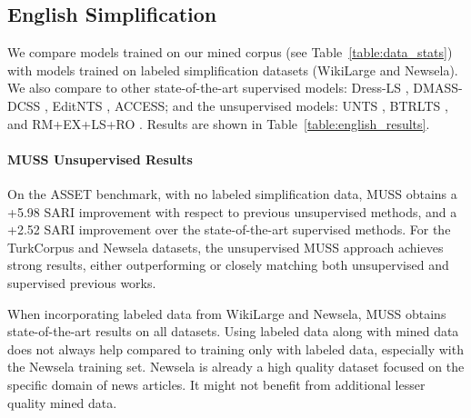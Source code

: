 \documentclass[11pt]{article}
\newcommand{\wikilarge}{WikiLarge\xspace}
\newcommand{\asset}{ASSET\xspace}
\newcommand{\newsela}{Newsela\xspace}
\newcommand{\turkcorpus}{TurkCorpus\xspace}
\newcommand{\muss}{\textsc{MUSS}\xspace}
\newcommand{\access}{\mbox{\textsc{ACCESS}}\xspace}
\begin{document}
\subsection{English Simplification}


We compare models trained on our mined corpus (see Table~\ref{table:data_stats}) with models trained on labeled simplification datasets (\wikilarge and \newsela). We also compare to other state-of-the-art supervised models: Dress-LS \cite{zhang2017sentence}, DMASS-DCSS \cite{zhao2018integrating}, EditNTS \cite{dong2019editnts}, \access \cite{martin2020controllable}; and the unsupervised models: UNTS \cite{surya2018unsupervised}, BTRLTS \cite{Zhao2020SemiSupervisedTS}, and RM+EX+LS+RO \cite{kumar-etal-2020-iterative}.
Results are shown in Table~\ref{table:english_results}.




\paragraph{\muss Unsupervised Results}
On the \asset benchmark, with no labeled simplification data, \muss obtains a +5.98 SARI improvement with respect to previous unsupervised methods, and a +2.52 SARI improvement over the state-of-the-art supervised methods.
For the \turkcorpus and \newsela datasets, the unsupervised \muss approach achieves strong results, either outperforming or closely matching both unsupervised and supervised previous works.

When incorporating labeled data from \wikilarge and \newsela, \muss obtains state-of-the-art results on all datasets.
Using labeled data along with mined data does not always help compared to training only with labeled data, especially with the \newsela training set. \newsela is already a high quality dataset focused on the specific domain of news articles. It might not benefit from additional lesser quality mined data.
\end{document}

